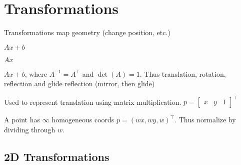 \section{Transformations}

Transformations map geometry (change position, etc.)

\begin{definition}
  \(Ax + b\)
\end{definition}

\begin{definition}[Linear]
  \(Ax\)
\end{definition}

\begin{definition}[Rigid]
  \(Ax + b\), where \(A^{-1} = A^\top\) and \(\det(A) = 1\). Thus translation, rotation, reflection and glide reflection (mirror, then glide)
\end{definition}

\begin{definition}
  Used to represent translation using matrix multiplication. \(p = \begin{bmatrix}
    x & y & 1
  \end{bmatrix}^\top\)
\end{definition}

\begin{theorem}
  A point has \(\infty\) homogeneous coords \(p = (wx, wy, w)^\top\).
  Thus normalize by dividing through \(w\).
\end{theorem}

\subsection{2D Transformations}

